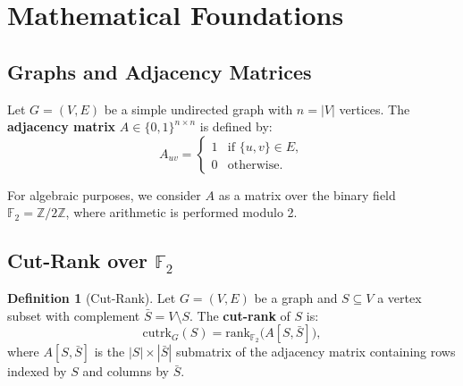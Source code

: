 \documentclass[11pt,a4paper]{article}
\theoremstyle{definition}
\newtheorem{definition}{Definition}[section]
\theoremstyle{plain}
\theoremstyle{remark}
\newcommand{\GF}{\mathbb{F}_2}
\newcommand{\rank}{\mathrm{rank}}
\newcommand{\cutrk}{\mathrm{cutrk}}
\begin{document}
\section{Mathematical Foundations}

\subsection{Graphs and Adjacency Matrices}

Let $G = (V, E)$ be a simple undirected graph with $n = |V|$ vertices.
The \textbf{adjacency matrix} $A \in \{0,1\}^{n \times n}$ is defined by:
\[
  A_{uv} = 
  \begin{cases}
    1 & \text{if } \{u,v\} \in E,\\
    0 & \text{otherwise}.
  \end{cases}
\]

For algebraic purposes, we consider $A$ as a matrix over the binary field
$\GF = \mathbb{Z}/2\mathbb{Z}$, where arithmetic is performed modulo 2.

\subsection{Cut-Rank over $\GF$}

\begin{definition}[Cut-Rank]
Let $G = (V, E)$ be a graph and $S \subseteq V$ a vertex subset with
complement $\bar{S} = V \setminus S$. The \textbf{cut-rank} of $S$ is:
\[
  \cutrk_G(S) = \rank_{\GF}\bigl( A[S, \bar{S}] \bigr),
\]
where $A[S, \bar{S}]$ is the $|S| \times |\bar{S}|$ submatrix of the
adjacency matrix containing rows indexed by $S$ and columns by $\bar{S}$.
\end{definition}
\end{document}
